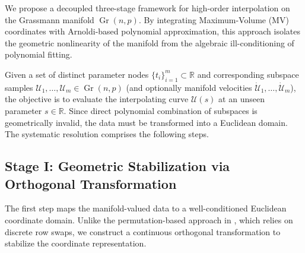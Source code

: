 \documentclass[11pt]{article}
\DeclareMathOperator{\Gr}{Gr}
\begin{document}
We propose a decoupled three-stage framework for high-order interpolation on the Grassmann manifold $\Gr(n,p)$. By integrating Maximum-Volume (MV) coordinates with Arnoldi-based polynomial approximation, this approach isolates the geometric nonlinearity of the manifold from the algebraic ill-conditioning of polynomial fitting.

Given a set of distinct parameter nodes $\{t_i\}_{i=1}^m \subset \mathbb{R}$ and corresponding subspace samples $\mathcal{U}_1, \dots, \mathcal{U}_m \in \Gr(n,p)$ (and optionally manifold velocities $\dot{\mathcal{U}}_1, \dots, \dot{\mathcal{U}}_m$), the objective is to evaluate the interpolating curve $\mathcal{U}(s)$ at an unseen parameter $s \in \mathbb{R}$. Since direct polynomial combination of subspaces is geometrically invalid, the data must be transformed into a Euclidean domain. The systematic resolution comprises the following steps.

\subsection{Stage I: Geometric Stabilization via Orthogonal Transformation}

The first step maps the manifold-valued data to a well-conditioned Euclidean coordinate domain. Unlike the permutation-based approach in \cite{jensen2024maximum}, which relies on discrete row swaps, we construct a continuous orthogonal transformation to stabilize the coordinate representation.
\end{document}
